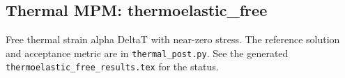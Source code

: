 \subsection{Thermal MPM: thermoelastic\_free}
Free thermal strain alpha DeltaT with near-zero stress. The reference solution and acceptance metric are in \texttt{thermal\_post.py}. See the generated \texttt{thermoelastic\_free\_results.tex} for the status.
